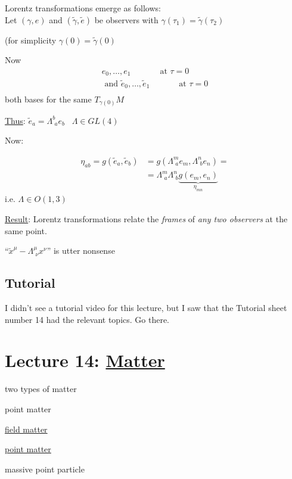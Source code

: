 \documentclass[10pt, twoside]{amsart}
\begin{document}
\begin{multicols*}{2}
Lorentz transformations emerge as follows: \\
Let $(\gamma,e)$ and $(\widetilde{\gamma},\widetilde{e})$ be observers with $\gamma(\tau_1) = \widetilde{\gamma}(\tau_2)$

(for simplicity $\gamma(0) = \widetilde{\gamma}(0)$

Now 
\[
\begin{gathered}
  e_0 , \dots , e_1 \quad \quad \quad \, \text{ at } \tau = 0 \\
  \text{ and } 
  \widetilde{e}_0 , \dots , \widetilde{e}_1 \quad \quad \quad \, \text{ at }  \tau = 0 \\
\end{gathered}
\]
both bases for the same $T_{\gamma(0)}M$

\underline{Thus}: $\widetilde{e}_a = \Lambda^b_{ \, \, a} e_b $ \quad \quad \, $\Lambda \in GL(4)$

Now:

\[
\begin{aligned}
  \eta_{ab} = g(\widetilde{e}_a, \widetilde{e}_b) & = g(\Lambda^m_{ \, \, a}e_m, \Lambda^n_{ \, \, b} e_n ) = \\
  & = \Lambda^m_{ \, \, a} \Lambda^n_{ \, \, b} \underbrace{g(e_m,e_n)}_{ \eta_{mn}}
\end{aligned}
\]
i.e. $\Lambda \in O(1,3)$

\underline{Result}: Lorentz transformations relate the \emph{frames} of \emph{any two observers} at the same point.

``$\widetilde{x}^{\mu} - \Lambda^{\mu}_{ \, \, \nu} x^{\nu}$'' is utter nonsense

\subsection*{Tutorial}

I didn't see a tutorial video for this lecture, but I saw that the Tutorial sheet number 14 had the relevant topics.  Go there.

\section{Lecture 14: \underline{Matter}}

two types of matter

point matter

\underline{field matter}

\underline{point matter}

massive point particle 


\end{multicols*}
\end{document}
